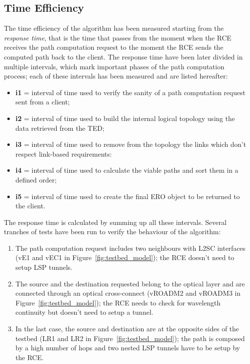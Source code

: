 \documentclass[10pt,a4paper]{report}
\begin{document}
\subsection{Time Efficiency}
The time efficiency of the algorithm has been measured starting from
the \textit{response time}, that is the time that passes from the
moment when the RCE receives the path computation request to the
moment the RCE sends the computed path back to the client. The
response time have been later divided in multiple intervals, which
mark important phases of the path computation process; each of these
intervals has been measured and are listed hereafter:
\begin{itemize}
\item \textbf{i1} = interval of time used to verify the sanity of a
  path computation request sent from a client;
\item \textbf{i2} = interval of time used to build the internal logical
  topology using the data retrieved from the TED;
\item \textbf{i3} = interval of time used to remove from the topology
  the links which don't respect link-based requirements:
\item \textbf{i4} = interval of time used to calculate the viable paths and
  sort them in a defined order;
\item \textbf{i5} = interval of time used to create the final ERO
  object to be returned to the client.
\end{itemize}
The response time is calculated by summing up all these
intervals. Several tranches of tests have been run to verify the
behaviour of the algorithm:
\begin{enumerate}
\item The path computation request includes two neighbours with L2SC
  interfaces (vE1 and vEC1 in Figure~\ref{fig:testbed_model}); the RCE
  doesn't need to setup LSP tunnels.
\item The source and the destination requested belong to the optical
  layer and are connected through an optical cross-connect (vROADM2
  and vROADM3 in Figure~\ref{fig:testbed_model}); the RCE needs to
  check for wavelength continuity but doesn't need to setup a tunnel.
\item In the last case, the source and destination are at the opposite
  sides of the testbed (LR1 and LR2 in
  Figure~\ref{fig:testbed_model}); the path is composed by a high
  number of hops and two nested LSP tunnels have to be setup by the
  RCE.
\end{enumerate}
\end{document}

